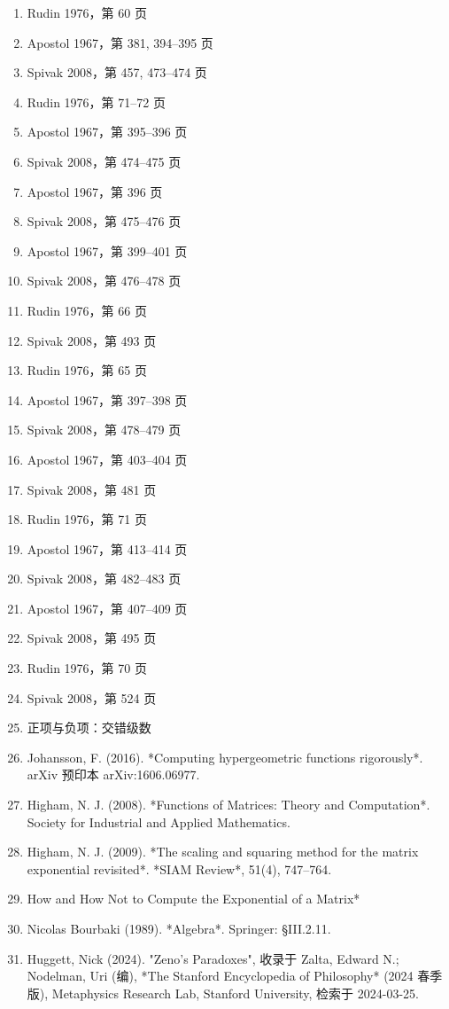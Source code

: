 \begin{enumerate}
\item Rudin 1976，第 60 页
\item Apostol 1967，第 381, 394–395 页
\item Spivak 2008，第 457, 473–474 页
\item Rudin 1976，第 71–72 页
\item Apostol 1967，第 395–396 页
\item Spivak 2008，第 474–475 页
\item Apostol 1967，第 396 页
\item Spivak 2008，第 475–476 页
\item Apostol 1967，第 399–401 页
\item Spivak 2008，第 476–478 页
\item Rudin 1976，第 66 页
\item Spivak 2008，第 493 页
\item Rudin 1976，第 65 页
\item Apostol 1967，第 397–398 页
\item Spivak 2008，第 478–479 页
\item Apostol 1967，第 403–404 页
\item Spivak 2008，第 481 页
\item Rudin 1976，第 71 页
\item Apostol 1967，第 413–414 页
\item Spivak 2008，第 482–483 页
\item Apostol 1967，第 407–409 页
\item Spivak 2008，第 495 页
\item Rudin 1976，第 70 页
\item Spivak 2008，第 524 页
\item 正项与负项：交错级数
\item Johansson, F. (2016). *Computing hypergeometric functions rigorously*. arXiv 预印本 arXiv:1606.06977.
\item Higham, N. J. (2008). *Functions of Matrices: Theory and Computation*. Society for Industrial and Applied Mathematics.
\item Higham, N. J. (2009). *The scaling and squaring method for the matrix exponential revisited*. *SIAM Review*, 51(4), 747–764.
\item How and How Not to Compute the Exponential of a Matrix*
\item Nicolas Bourbaki (1989). *Algebra*. Springer: §III.2.11.
\item Huggett, Nick (2024). "Zeno's Paradoxes", 收录于 Zalta, Edward N.; Nodelman, Uri (编), *The Stanford Encyclopedia of Philosophy* (2024 春季版), Metaphysics Research Lab, Stanford University, 检索于 2024-03-25.

\end{enumerate}
